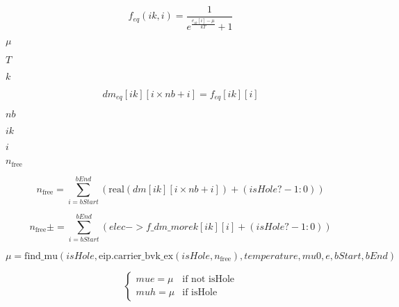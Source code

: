 \documentclass{article}
\begin{document}
\[ f_{eq}(ik, i) = \frac{1}{e^{\frac{e_{ik}[i] - \mu}{kT}} + 1} \]
\pagebreak

$\mu$
\pagebreak

$T$
\pagebreak

$k$
\pagebreak

\[ dm_{eq}[ik][i \times nb + i] = f_{eq}[ik][i] \]
\pagebreak

$nb$
\pagebreak

$ik$
\pagebreak

$i$
\pagebreak

$n_{\text{free}}$
\pagebreak

\[ n_{\text{free}} = \sum_{i=bStart}^{bEnd} \left( \text{real}(dm[ik][i \times nb + i]) + (isHole ? -1 : 0) \right) \]
\pagebreak

\[ n_{\text{free}} \pm= \sum_{i=bStart}^{bEnd} \left( elec->f\_dm\_morek[ik][i] + (isHole ? -1 : 0) \right) \]
\pagebreak

\[ \mu = \text{find\_mu}(isHole, \text{eip.carrier\_bvk\_ex}(isHole, n_{\text{free}}), temperature, mu0, e, bStart, bEnd) \]
\pagebreak

\[ \begin{cases} mue = \mu & \text{if not isHole} \\ muh = \mu & \text{if isHole} \end{cases} \]
\pagebreak
\end{document}
